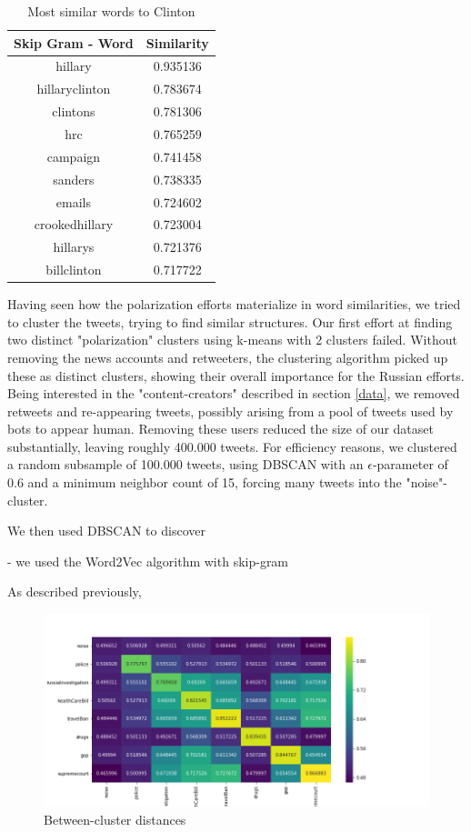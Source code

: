 \documentclass[12pt, authoryear]{elsarticle}
\begin{document}
\begin{center}
\begin{table}[H]
\begin{tabular}{ c c } 
Skip Gram - Word   &  Similarity \\
 \hline
hillary   &  0.935136\\
hillaryclinton   &  0.783674\\
clintons &    0.781306\\
hrc   &  0.765259\\
campaign  &   0.741458\\
sanders  &  0.738335\\
emails   &  0.724602\\
crookedhillary    & 0.723004\\
hillarys   &  0.721376\\
billclinton  &   0.717722\\
 \hline
\end{tabular}
\caption{Most similar words to Clinton}
\label{table:6}
\end{table}
\end{center}


Having seen how the polarization efforts materialize in word similarities, we tried to cluster the tweets, trying to find similar structures. Our first effort at finding two distinct "polarization" clusters using k-means with 2 clusters failed. Without removing the news accounts and retweeters, the clustering algorithm picked up these as distinct clusters, showing their overall importance for the Russian efforts. Being interested in the "content-creators" described in section \ref{data}, we removed retweets and re-appearing tweets, possibly arising from a pool of tweets used by bots to appear human. Removing these users reduced the size of our dataset substantially, leaving roughly 400.000 tweets. For efficiency reasons, we clustered a random subsample of 100.000 tweets, using DBSCAN with an $\epsilon$-parameter of 0.6 and a minimum neighbor count of 15, forcing many tweets into the "noise"-cluster. 


We then used DBSCAN to discover 

- we used the Word2Vec algorithm with skip-gram 

As described previously,



\begin{figure}[t]
\includegraphics[width=7in]{heatmap_cluster_similarity}
\centering
\caption{Between-cluster distances}
\label{distance:1}
\end{figure}
\end{document}
